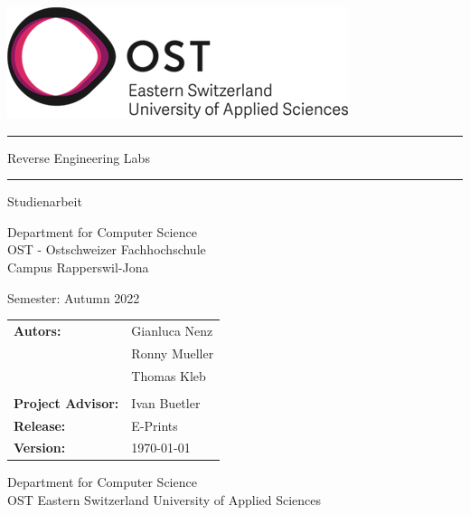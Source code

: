 \begin{titlepage}

    \begin{center}

        \includegraphics[height=0.15\textwidth, right]{resources/ost-logo.png}

        \vspace{2.5 cm}

        \hrule
        \vspace{0.8cm}
        {\Huge Reverse Engineering Labs}
        \vspace{0.8cm}
        \hrule
        \vspace{1.5cm}

        {\LARGE Studienarbeit}

         
        \vspace{1 cm}

        Department for Computer Science \\
        OST - Ostschweizer Fachhochschule \\
        Campus Rapperswil-Jona \\

        \vspace{1 cm}

        Semester: Autumn 2022

        \vspace{3 cm}
        
        \begin{table}[h!]
            \centering
            \begin{tabular}{@{}ll}
                \textbf{Autors:}    & Gianluca Nenz \\
                                          & Ronny Mueller \\
                                          & Thomas Kleb \\
                                          &                    \\
                \textbf{Project Advisor:} & Ivan Buetler \\
                \textbf{Release:} & E-Prints \\
                \textbf{Version:} & \today
            \end{tabular}
        \end{table}
        

        \vfill


        \vspace{1cm}
        Department for Computer Science\\
        OST Eastern Switzerland University of Applied Sciences

    \end{center}

\end{titlepage}
